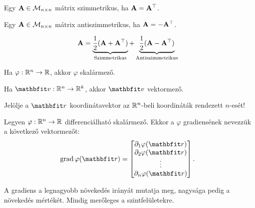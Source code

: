 \documentclass{szb-practice}
\begin{document}
\begin{definition}
  Egy $\mathbf{A} \in \mathcal M_{n \times n}$ mátrix szimmetrikus, ha
  $\mathbf{A} = \mathbf{A}^\top$.
\end{definition}

\begin{definition}
  Egy $\mathbf{A} \in \mathcal M_{n \times n}$ mátrix antiszimmetrikus, ha
  $\mathbf{A} = -\mathbf{A}^\top$.
\end{definition}

\begin{blueBox}
  $$
    \mathbf{A} =
    \underbrace{\frac{1}{2}(\mathbf{A} + \mathbf{A}^\top)}_{\text{Szimmetrikus}}
    + \underbrace{\frac{1}{2}(\mathbf{A} - \mathbf{A}^\top)}_{\text{Antiszimmetrikus}}
  $$
\end{blueBox}

\begin{blueBox}

  Ha $\varphi : \mathbb{R}^n \to \mathbb{R}$, akkor $\varphi$ skalármező.

  Ha $\rvec v : \Reals^n \to \Reals^k$, akkor $\rvec v$ vektormező.
\end{blueBox}

\begin{blueBox}

  Jelölje a $\coordvec$ koordinátavektor az $\mathbb{R}^n$-beli koordináták
  rendezett $n$-esét!
\end{blueBox}

\begin{definition}[Gradiens]
  Legyen $\varphi: \mathbb{R}^n \to \mathbb{R}$ differenciálható skalármező. Ekkor a
  $\varphi$ gradiensének nevezzük a következő vektormezőt:
  $$
    \grad \varphi(\coordvec) = \begin{bmatrix}
      \partial_1 \varphi(\coordvec) \\
      \partial_2 \varphi(\coordvec) \\
      \vdots                        \\
      \partial_n \varphi(\coordvec)
    \end{bmatrix}
    \text.
  $$
\end{definition}

\begin{note}
  A gradiens a legnagyobb növekedés irányát mutatja meg, nagysága pedig a
  növekedés mértékét. Mindig merőleges a szintfelületekre.
\end{note}
\end{document}
